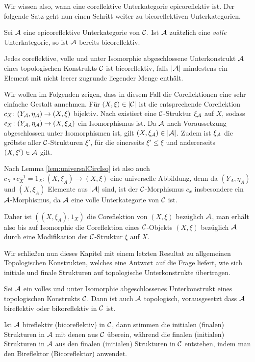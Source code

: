 Wir wissen also, wann eine coreflektive Unterkategorie epicoreflektiv ist. 
Der folgende Satz geht nun einen Schritt weiter zu bicoreflektiven Unterkategorien.

\begin{thm}
  Sei $\mathcal{A}$ eine epicoreflektive Unterkategorie von $\mathcal{C}$. 
  Ist $\mathcal{A}$ zuätzlich eine \emph{volle} Unterkategorie, so ist $\mathcal{A}$ bereits bicoreflektiv.
\end{thm}

\begin{bem}[2.2.11, S.65]
  Jedes coreflektive, volle und unter Isomorphie abgeschlossene Unterkonstrukt $\mathcal{A}$ eines topologischen Konstrukts $\mathcal{C}$ ist bicoreflektiv, falls $|\mathcal{A}|$ mindestens ein Element mit nicht leerer zugrunde liegender Menge enthält.

  Wir wollen im Folgenden zeigen, dass in diesem Fall die Coreflektionen eine sehr einfache Gestalt annehmen.  
  Für $(X, \xi) \in |\mathcal{C}|$ ist die entsprechende Coreflektion $c_X \colon (Y_{\mathcal{A}}, \eta_{\mathcal{A}}) \to (X, \xi)$ bijektiv.
  Nach \cite[1.2.2.7]{preuss} existiert eine $\mathcal{C}$-Struktur $\xi_{\mathcal{A}}$ auf $X$, sodass $c_X \colon (Y_{\mathcal{A}}, \eta_{\mathcal{A}}) \to (X, \xi_{\mathcal{A}})$ ein Isomorphismus ist.
  Da $\mathcal{A}$ nach Voraussetzung abgeschlossen unter Isomorphismen ist, gilt $(X, \xi_{\mathcal{A}})\in |\mathcal{A}|$.
  Zudem ist $\xi_{\mathcal{A}}$ die gröbste aller $\mathcal{C}$-Strukturen $\xi'$, für die einerseits $\xi' \leq \xi$ und andererseits $(X, \xi') \in \mathcal{A}$ gilt.

  Nach Lemma \ref{lem:universalCircIso} ist also auch $c_X \circ c_X^{-1} = 1_X \colon (X,\xi_A) \to (X,\xi)$ eine universelle Abbildung, denn da $(Y_A,\eta_A)$ und $(X,\xi_A)$ Elemente aus $|\mathcal{A}|$ sind, ist der $\mathcal{C}$-Morphismus $c_x$ insbesondere ein $\mathcal{A}$-Morphismus, da $\mathcal{A}$ eine volle Unterkategorie von $\mathcal{C}$ ist.

  Daher ist $((X,\xi_A), 1_X)$ die Coreflektion von $(X,\xi)$ bezüglich $\mathcal{A}$, man erhält also bis auf Isomorphie die Coreflektion eines  $\mathcal{C}$-Objekts $(X,\xi)$ bezüglich $\mathcal{A}$ durch eine Modifikation der $\mathcal{C}$-Struktur $\xi$ auf $X$.
\end{bem}

Wir schließen nun dieses Kapitel mit einem letzten Resultat zu allgemeinen Topologischen Konstrukten, welches eine Antwort auf die Frage liefert, wie sich initiale und finale Strukturen auf topologische Unterkonstrukte übertragen.

\begin{thm}
  Sei $\mathcal{A}$ ein volles und unter Isomorphie abgeschlossenes Unterkonstrukt eines topologischen Konstrukts $\mathcal{C}$.
  Dann ist auch $\mathcal{A}$ topologisch, vorausgesetzt dass $\mathcal{A}$ bireflektiv oder bikoreflektiv in $\mathcal{C}$ ist.
  
  Ist $\mathcal{A}$ bireflektiv (bicoreflektiv) in $\mathcal{C}$, dann stimmen die initialen (finalen) Strukturen in $\mathcal{A}$ mit denen aus $\mathcal{C}$ überein, während die finalen (initialen) Strukturen in $\mathcal{A}$ aus den finalen (initialen) Strukturen in $\mathcal{C}$ entstehen, indem man den Bireflektor (Bicoreflektor) anwendet.
\end{thm}

